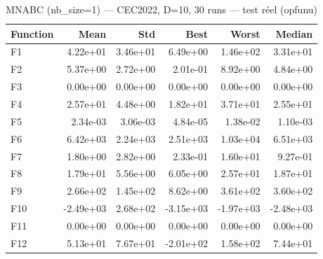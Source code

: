\begin{table}[htbp]
\centering
\caption{MNABC (nb\_size=1) — CEC2022, D=10, 30 runs — test réel (opfunu)}
\label{tab:mnabc_nb1_D10_real}
\begin{tabular}{lrrrrr}
\toprule
Function & Mean & Std & Best & Worst & Median \\
\midrule
F1 & 4.22e+01 & 3.46e+01 & 6.49e+00 & 1.46e+02 & 3.31e+01 \\
F2 & 5.37e+00 & 2.72e+00 & 2.01e-01 & 8.92e+00 & 4.84e+00 \\
F3 & 0.00e+00 & 0.00e+00 & 0.00e+00 & 0.00e+00 & 0.00e+00 \\
F4 & 2.57e+01 & 4.48e+00 & 1.82e+01 & 3.71e+01 & 2.55e+01 \\
F5 & 2.34e-03 & 3.06e-03 & 4.84e-05 & 1.38e-02 & 1.10e-03 \\
F6 & 6.42e+03 & 2.24e+03 & 2.51e+03 & 1.03e+04 & 6.51e+03 \\
F7 & 1.80e+00 & 2.82e+00 & 2.33e-01 & 1.60e+01 & 9.27e-01 \\
F8 & 1.79e+01 & 5.56e+00 & 6.05e+00 & 2.57e+01 & 1.87e+01 \\
F9 & 2.66e+02 & 1.45e+02 & 8.62e+00 & 3.61e+02 & 3.60e+02 \\
F10 & -2.49e+03 & 2.68e+02 & -3.15e+03 & -1.97e+03 & -2.48e+03 \\
F11 & 0.00e+00 & 0.00e+00 & 0.00e+00 & 0.00e+00 & 0.00e+00 \\
F12 & 5.13e+01 & 7.67e+01 & -2.01e+02 & 1.58e+02 & 7.44e+01 \\
\bottomrule
\end{tabular}
\end{table}